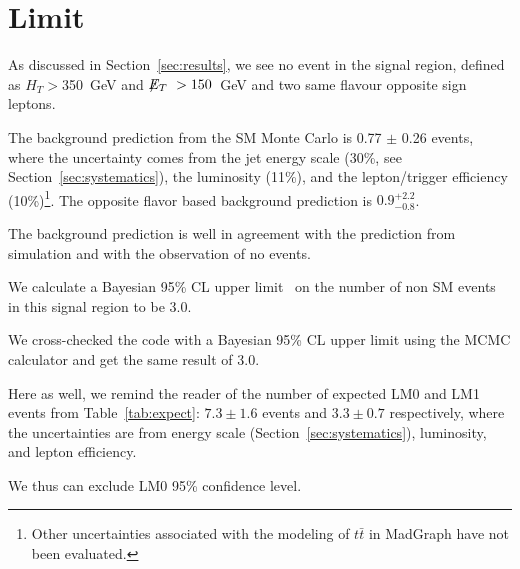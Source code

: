 \section{Limit}\label{sec:significance}

As discussed in Section~\ref{sec:results}, we see no event 
in the signal region, defined as $H_T>$350~GeV and 
$\displaystyle{\not} E_T~>150$~GeV and two same flavour opposite sign leptons.

The background prediction from the SM Monte Carlo is 
0.77 $\pm$ 0.26 events, where the uncertainty comes from 
the jet energy scale (30\%, see Section~\ref{sec:systematics}),
the luminosity (11\%), and the lepton/trigger 
efficiency (10\%)\footnote{Other uncertainties associated with 
the modeling of $t\bar{t}$ in MadGraph have not been evaluated.}.
The opposite flavor based background prediction is $0.9 {}_{-0.8}^{+ 2.2}$.

The background prediction is well in agreement with the prediction from
simulation and with the observation of no events.

We calculate a Bayesian 95\% CL upper limit~\cite{bayes} 
on the number of non SM events in this signal region to be 3.0.

We cross-checked the code with a Bayesian 95\% CL upper limit using the MCMC calculator\cite{roostats} 
and get the same result of 3.0.

Here as well, we remind the reader of the number of expected
LM0 and LM1 events from Table~\ref{tab:expect}: $7.3 \pm 1.6$ 
events and $3.3 \pm 0.7$ respectively, where the uncertainties
are from energy scale (Section~\ref{sec:systematics}), luminosity,
and lepton efficiency.

We thus can exclude LM0 95\% confidence level.
